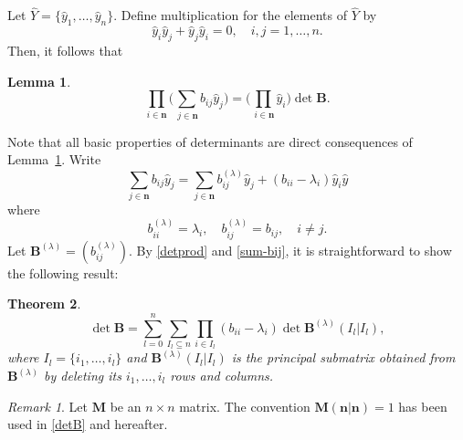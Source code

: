 \documentclass{article}
\newtheorem{thm}{Theorem}[section]
\newtheorem{lem}[thm]{Lemma}
\theoremstyle{definition}
\theoremstyle{remark}
\newtheorem{rem}{Remark}[section]
\newcommand{\wh}{\widehat}
\begin{document}
Let $\wh Y=\{\hat y_1,\dots,\hat y_n\}$. Define multiplication
for the elements of $\wh Y$ by
\begin{equation}
\hat y_i\hat y_j+\hat y_j\hat y_i=0,\quad i,j=1,\dots,n.
\end{equation}
Then, it follows that
\begin{lem}\label{lem-det}
\begin{equation}\label{detprod}
\prod_{i\in\mathbf{n}}
\biggl(\sum_{\,j\in\mathbf{n}}b_{ij}\hat y_j\biggr)
=\biggl(\prod_{\,i\in\mathbf{n}}\hat y_i\biggr)\det\mathbf{B}.
\end{equation}
\end{lem}

Note that all basic properties of determinants are direct consequences
of Lemma~\ref{lem-det}. Write
\begin{equation}\label{sum-bij}
\sum_{j\in\mathbf{n}}b_{ij}\hat y_j=\sum_{j\in\mathbf{n}}b^{(\lambda)}
_{ij}\hat y_j+(b_{ii}-\lambda_i)\hat y_i\hat y
\end{equation}
where
\begin{equation}
b^{(\lambda)}_{ii}=\lambda_i,\quad b^{(\lambda)}_{ij}=b_{ij},
\quad i\not=j.
\end{equation}
Let $\mathbf{B}^{(\lambda)}=(b^{(\lambda)}_{ij})$. By \eqref{detprod}
and \eqref{sum-bij}, it is
straightforward to show the following
result:
\begin{thm}\label{thm-main}
\begin{equation}\label{detB}
\det\mathbf{B}=
\sum^n_{l =0}\sum_{I_l \subseteq n}
\prod_{i\in I_l}(b_{ii}-\lambda_i)
\det\mathbf{B}^{(\lambda)}(I_l |I_l ),
\end{equation}
where $I_l =\{i_1,\dots,i_l \}$ and $\mathbf{B}^{(\lambda)}(I_l |I_l )$
is the principal submatrix obtained from $\mathbf{B}^{(\lambda)}$
by deleting its $i_1,\dots,i_l $ rows and columns.
\end{thm}

\begin{rem}
Let $\mathbf{M}$ be an $n\times n$ matrix. The convention
$\mathbf{M}(\mathbf{n}|\mathbf{n})=1$ has been used in \eqref{detB} and
hereafter.
\end{rem}
\end{document}
